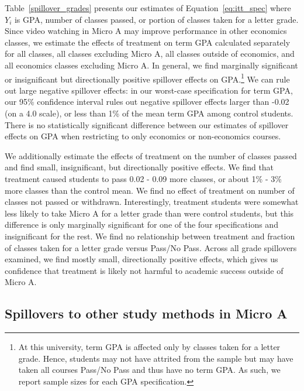 \documentclass[12pt]{article}
\begin{document}
Table~\ref{spillover_grades} presents our estimates of Equation~\ref{eq:itt_spec} where $Y_i$ is GPA, number of classes passed, or portion of classes taken for a letter grade.
Since video watching in Micro A may improve performance in other economics classes, we estimate the effects of treatment on term GPA calculated separately for all classes, all classes excluding Micro A, all classes outside of economics, and all economics classes excluding Micro A. In general, we find marginally significant or insignificant but directionally positive spillover effects on GPA.\footnote{At this university, term GPA is affected only by classes taken for a letter grade. Hence, students may not have attrited from the sample but may have taken all courses Pass/No Pass and thus have no term GPA. As such, we report sample sizes for each GPA specification.} We can rule out large negative spillover effects: in our worst-case specification for term GPA, our 95\% confidence interval rules out negative spillover effects larger than -0.02 (on a 4.0 scale), or less than 1\% of the mean term GPA among control students.
There is no statistically significant difference between our estimates of spillover effects on GPA when restricting to only economics or non-economics courses.

We additionally estimate the effects of treatment on the number of classes passed and find small, insignificant, but directionally positive effects.
We find that treatment caused students to pass 0.02 - 0.09 more classes, or about 1\% - 3\% more classes than the control mean.
We find no effect of treatment on number of classes not passed or withdrawn.
Interestingly, treatment students were somewhat less likely to take Micro A for a letter grade than were control students, but this difference is only marginally significant for one of the four specifications and insignificant for the rest.
We find no relationship between treatment and fraction of classes taken for a letter grade versus Pass/No Pass.
Across all grade spillovers examined, we find mostly small, directionally positive effects, which gives us confidence that treatment is likely not harmful to academic success outside of Micro A.

\subsection{Spillovers to other study methods in Micro A}\label{subsec:spillovers_studying}
\end{document}
